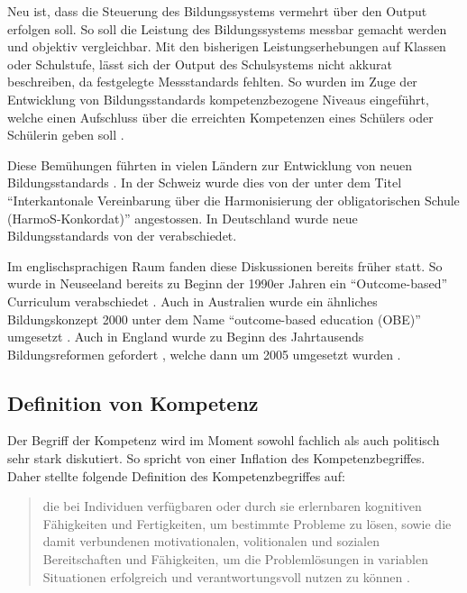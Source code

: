 Neu ist, dass die Steuerung des Bildungssystems vermehrt über den Output erfolgen soll. So soll die Leistung des Bildungssystems messbar gemacht werden und objektiv vergleichbar. Mit den bisherigen Leistungserhebungen auf Klassen oder Schulstufe, lässt sich der Output des Schulsystems nicht akkurat beschreiben, da festgelegte Messstandards fehlten. So wurden im Zuge der Entwicklung von Bildungsstandards kompetenzbezogene Niveaus eingeführt, welche einen Aufschluss über die erreichten Kompetenzen eines Schülers oder Schülerin geben soll \citep{Oelkers2008}.


Diese Bemühungen führten in vielen Ländern zur Entwicklung von neuen Bildungsstandards \citep{Berner2006}. In der Schweiz wurde dies von der \citet{EDKSchweizerKonfernezderKantonalenErziehungsdirektoren2004} unter dem Titel "`Interkantonale Vereinbarung über die Harmonisierung der obligatorischen Schule (HarmoS-Konkordat)"' angestossen. In Deutschland wurde neue Bildungsstandards von der \citet{Kultusministerkonferenz2004} verabschiedet.

Im englischsprachigen Raum fanden diese Diskussionen bereits früher statt. So wurde in Neuseeland bereits zu Beginn der 1990er Jahren ein "`Outcome-based"' Curriculum verabschiedet \citep{McGee1996}. Auch in Australien wurde ein ähnliches Bildungskonzept 2000 unter dem Name "`outcome-based education (OBE)"' umgesetzt  \citep{Killen2000}. Auch in England wurde zu Beginn des Jahrtausends Bildungsreformen gefordert \citep{Millar1999}, welche dann um 2005 umgesetzt wurden \citep{Huber2006}.




\subsection{Definition von Kompetenz}

Der Begriff der Kompetenz wird im Moment sowohl fachlich als auch politisch sehr stark diskutiert. So spricht \citet{Weinert2001b} von einer Inflation des Kompetenzbegriffes.
Daher stellte \citet[S.27]{Weinert2001a} folgende Definition des Kompetenzbegriffes auf:

\begin{quote}
 die bei Individuen verfügbaren oder durch sie erlernbaren kognitiven Fähigkeiten und Fertigkeiten, um bestimmte Probleme zu lösen, sowie die damit verbundenen motivationalen, volitionalen und sozialen Bereitschaften und Fähigkeiten, um die Problemlösungen in variablen Situationen erfolgreich und verantwortungsvoll nutzen zu können \citep[S.27]{Weinert2001a}.
\end{quote}

